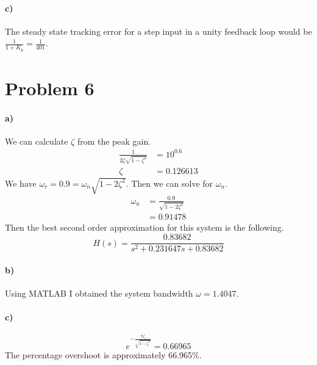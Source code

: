 \documentclass[12pt]{article}
\begin{document}
\paragraph{c)}

The steady state tracking error for a step input in a unity feedback loop would be \(\frac{1}{1+K_p}=\frac{1}{401}\).

\section*{Problem 6}

\paragraph{a)}

We can calculate \(\zeta\) from the peak gain.
\begin{align*}
    \frac{1}{2\zeta\sqrt{1-\zeta^2}}&=10^{0.6}\\
    \zeta&=0.126613
\end{align*}
We have \(\omega_r=0.9=\omega_n\sqrt{1-2\zeta^2}\). Then we can solve for \(\omega_n\).
\begin{align*}
    \omega_n&=\frac{0.9}{\sqrt{1-2\zeta^2}}\\
    &=0.91478
\end{align*}
Then the best second order approximation for this system is the following.
\[H(s)=\frac{0.83682}{s^2+0.231647s+0.83682}\]

\paragraph{b)}

Using MATLAB I obtained the system bandwidth \(\omega=1.4047\).

\paragraph{c)}

\[e^{-\frac{\pi\zeta}{\sqrt{1-\zeta^2}}}=0.66965\]
The percentage overshoot is approximately 66.965\%.
\end{document}
